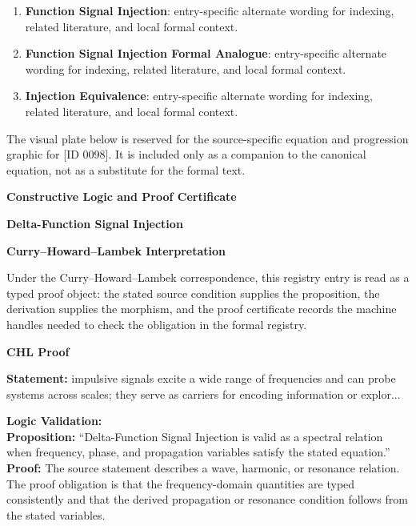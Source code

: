 \begingroup\footnotesize\sloppy
\begin{enumerate}[leftmargin=1.35em,itemsep=1pt,topsep=1pt,parsep=0pt]
\item \textbf{Function Signal Injection}: entry-specific alternate wording for indexing, related literature, and local formal context.
\item \textbf{Function Signal Injection Formal Analogue}: entry-specific alternate wording for indexing, related literature, and local formal context.
\item \textbf{Injection Equivalence}: entry-specific alternate wording for indexing, related literature, and local formal context.
\end{enumerate}
\endgroup

\begingroup\footnotesize\sloppy
The visual plate below is reserved for the source-specific equation and progression graphic for [ID 0098]. It is included only as a companion to the canonical equation, not as a substitute for the formal text.
\par\endgroup
\ifTZPDarkEdition
{}
\fi

\clearpage
\begingroup\tzpsupportsetup
\noindent\textbf{\fontsize{10.8pt}{12.8pt}\selectfont [ID 0098] Constructive Logic and Proof Certificate}\par
\noindent\textbf{\fontsize{10pt}{12pt}\selectfont Delta-Function Signal Injection}\par
\vspace{0.45em}
\begingroup
\footnotesize
\setlength{\parskip}{0.22em}
\setlength{\parindent}{0pt}
\noindent\textbf{Curry--Howard--Lambek Interpretation}\par
Under the Curry--Howard--Lambek correspondence, this registry entry is read as a typed proof
object: the stated source condition supplies the proposition, the derivation supplies the
morphism, and the proof certificate records the machine handles needed to check the obligation
in the formal registry.

\vspace{0.45em}
\noindent\textbf{CHL Proof}\par
\textbf{Statement:} impulsive signals excite a wide range of frequencies and can probe systems across
scales; they serve as carriers for encoding information or explor...

\textbf{Logic Validation:}\\
\textbf{Proposition:} ``Delta-Function Signal Injection is valid as a spectral relation when frequency, phase,
and propagation variables satisfy the stated equation.''\\
\textbf{Proof:} The source statement describes a wave, harmonic, or resonance relation. The proof
obligation is that the frequency-domain quantities are typed consistently and that the
derived propagation or resonance condition follows from the stated variables.

